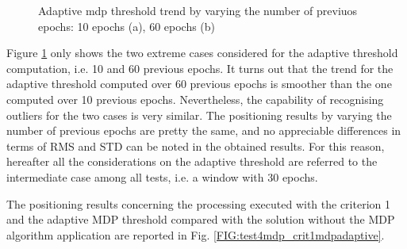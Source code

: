 \begin{figure}[H] 
	\centering
    \caption{Adaptive mdp threshold trend by varying the number of previuos epochs: 10 epochs (a), 60 epochs (b)}
	\label{FIG:test4mdp_adaptivethr} 
\end{figure}

Figure \ref{FIG:test4mdp_adaptivethr} only shows  the two extreme cases considered for the adaptive threshold computation, i.e. 10 and 60 previous epochs. It turns out  that the trend for the adaptive threshold computed over 60 previous epochs is smoother than the one computed over 10 previous epochs. Nevertheless, the capability of recognising outliers for the two cases is very similar. The positioning results by varying the number of previous epochs are pretty the same, and no appreciable differences in terms of RMS and STD can be noted in the obtained results. For this reason, hereafter all the considerations on the adaptive threshold are referred to the intermediate case among all tests, i.e. a window with 30 epochs.  

The positioning results concerning the processing executed with the criterion 1 and the adaptive MDP threshold compared with the solution without the MDP algorithm application are reported in Fig. \ref{FIG:test4mdp_crit1mdpadaptive}.

